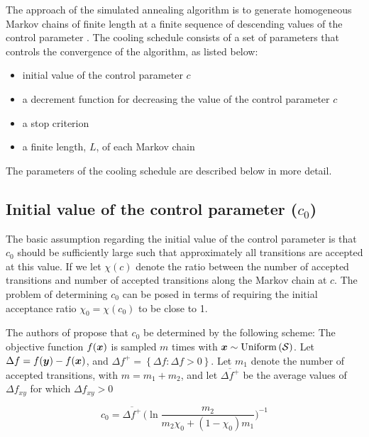 \hspace*{3mm}The approach of the simulated annealing algorithm is to generate homogeneous Markov chains of finite length at a finite sequence of descending values of the control parameter \cite{dekkers}. The cooling schedule consists of a set of parameters that controls the convergence of the algorithm, as listed below: \\
\begin{itemize}
\item initial value of the control parameter $c$ 
\item a decrement function for decreasing the value of the control parameter $c$
\item a stop criterion
\item a finite length, $L$, of each Markov chain\\ \cite{dekkers}   
\end{itemize}

The parameters of the cooling schedule are described below in more detail.

\subsection{Initial value of the control parameter ($c_0$)}

The basic assumption regarding the initial value of the control parameter is that $c_0$ should be sufficiently large such that approximately all transitions are accepted at this value. If we let $\chi(c)$ denote the ratio between the number of accepted transitions and number of accepted transitions along the Markov chain at $c$. The problem of determining $c_0$ can be posed in terms of requiring
the initial acceptance ratio $\chi_0=\chi(c_0)$ to be close to 1.

The authors of \cite{dekkers} propose that $c_0$ be determined by the following scheme: The objective function $f(\boldsymbol{x})$ is sampled
$m$ times with $\boldsymbol{x} \sim \mathrm{Uniform}\left( \mathcal{S}\right)$. Let $\Delta f = f(\boldsymbol{y}) - f(\boldsymbol{x})$, and
$\Delta f^+ = \left\lbrace \Delta f : \Delta f > 0 \right\rbrace$. Let $m_1$ denote the number of accepted transitions, with
$m=m_1+m_2$, and let $\overline{\Delta f^+}$ be the average values of $\Delta f_{xy}$ for which $\Delta f_{xy}>0$

\begin{equation}
\label{eq:3-2}
    c_0 = \overline{\Delta {f}^+} \, \Bigg(\ln \dfrac{m_2}{m_2 \chi_0+(1-\chi_0)m_1} \Bigg)^{-1} 
\end{equation}


